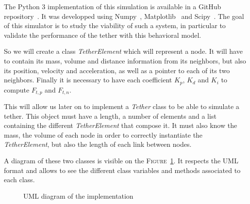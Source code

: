 The Python 3 implementation of this simulation is available in a GitHub repository~\cite{teusner_teusnertether_modeling_2021}. It was developped using Numpy~\cite{noauthor_numpy_nodate}, Matplotlib~\cite{noauthor_matplotlib_nodate} and Scipy~\cite{noauthor_scipyorg_nodate}. The goal of this simulator is to study the viability of such a system, in particular to validate the performance of the tether with this behavioral model.

So we will create a class \textit{TetherElement} which will represent a node. It will have to contain its mass, volume and distance information from its neighbors, but also its position, velocity and acceleration, as well as a pointer to each of its two neighbors. Finally it is necessary to have each coefficient $K_p$, $K_d$ and $K_i$ to compute $F_{t, p}$ and $F_{t, n}$.

This will allow us later on to implement a \textit{Tether} class to be able to simulate a tether. This object must have a length, a number of elements and a list containing the different \textit{TetherElement} that compose it. It must also know the mass, the volume of each node in order to correctly instantiate the \textit{TetherElement}, but also the length of each link between nodes.

A diagram of these two classes is visible on the \textsc{Figure}~\ref{fig:uml}. It respects the \textsc{UML} format and allows to see the different class variables and methods associated to each class.

\begin{figure}[!htb]
    \centering
    \caption{UML diagram of the implementation}
    \label{fig:uml}
\end{figure}
